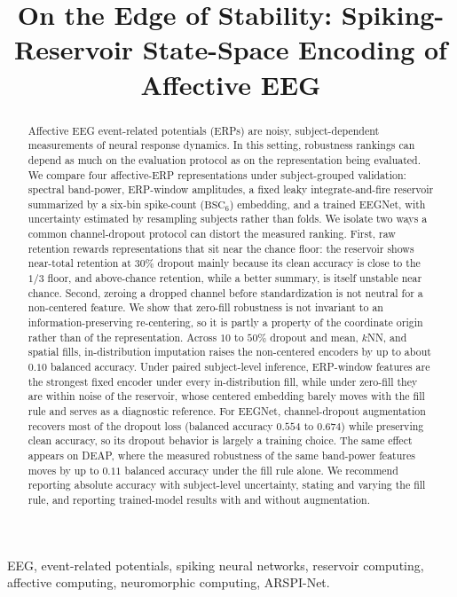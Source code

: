 \documentclass[conference]{IEEEtran}
\title{On the Edge of Stability: Spiking-Reservoir State-Space Encoding of Affective EEG}
\author{
\IEEEauthorblockN{Andrew A. Lane\IEEEauthorrefmark{1}, Wendy Tang\IEEEauthorrefmark{1}, and Brady D. Nelson\IEEEauthorrefmark{2}}
\IEEEauthorblockA{\IEEEauthorrefmark{1}Department of Electrical and Computer Engineering, Stony Brook University, Stony Brook, NY, USA}
\IEEEauthorblockA{\IEEEauthorrefmark{2}Department of Psychology, Stony Brook University, Stony Brook, NY, USA}
}
\newcommand{\BSC}{\ensuremath{\mathrm{BSC}_{6}}}
\begin{document}
\maketitle

\begin{abstract}
Affective EEG event-related potentials (ERPs) are noisy, subject-dependent measurements of neural response dynamics. In this setting, robustness rankings can depend as much on the evaluation protocol as on the representation being evaluated. We compare four affective-ERP representations under subject-grouped validation: spectral band-power, ERP-window amplitudes, a fixed leaky integrate-and-fire reservoir summarized by a six-bin spike-count (\BSC{}) embedding, and a trained EEGNet, with uncertainty estimated by resampling subjects rather than folds. We isolate two ways a common channel-dropout protocol can distort the measured ranking. First, raw retention rewards representations that sit near the chance floor: the reservoir shows near-total retention at $30\%$ dropout mainly because its clean accuracy is close to the $1/3$ floor, and above-chance retention, while a better summary, is itself unstable near chance. Second, zeroing a dropped channel before standardization is not neutral for a non-centered feature. We show that zero-fill robustness is not invariant to an information-preserving re-centering, so it is partly a property of the coordinate origin rather than of the representation. Across $10$ to $50\%$ dropout and mean, $k$NN, and spatial fills, in-distribution imputation raises the non-centered encoders by up to about $0.10$ balanced accuracy. Under paired subject-level inference, ERP-window features are the strongest fixed encoder under every in-distribution fill, while under zero-fill they are within noise of the reservoir, whose centered embedding barely moves with the fill rule and serves as a diagnostic reference. For EEGNet, channel-dropout augmentation recovers most of the dropout loss (balanced accuracy $0.554$ to $0.674$) while preserving clean accuracy, so its dropout behavior is largely a training choice. The same effect appears on DEAP, where the measured robustness of the same band-power features moves by up to $0.11$ balanced accuracy under the fill rule alone. We recommend reporting absolute accuracy with subject-level uncertainty, stating and varying the fill rule, and reporting trained-model results with and without augmentation.
\end{abstract}


\begin{IEEEkeywords}
EEG, event-related potentials, spiking neural networks, reservoir computing, affective computing, neuromorphic computing, ARSPI-Net.
\end{IEEEkeywords}
\end{document}
